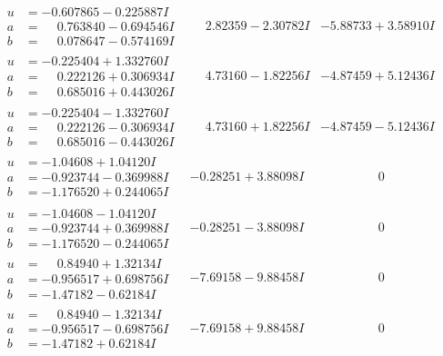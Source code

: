 \documentclass[1p]{elsarticle_modified}
\theoremstyle{definition}
\begin{document}
$$\begin{array}{c|c|c}
\begin{aligned}
u &= -0.607865 - 0.225887 I \\
a &= \phantom{-}0.763840 - 0.694546 I \\
b &= \phantom{-}0.078647 - 0.574169 I\end{aligned}
 & \phantom{-}2.82359 - 2.30782 I & -5.88733 + 3.58910 I \\ \hline\begin{aligned}
u &= -0.225404 + 1.332760 I \\
a &= \phantom{-}0.222126 + 0.306934 I \\
b &= \phantom{-}0.685016 + 0.443026 I\end{aligned}
 & \phantom{-}4.73160 - 1.82256 I & -4.87459 + 5.12436 I \\ \hline\begin{aligned}
u &= -0.225404 - 1.332760 I \\
a &= \phantom{-}0.222126 - 0.306934 I \\
b &= \phantom{-}0.685016 - 0.443026 I\end{aligned}
 & \phantom{-}4.73160 + 1.82256 I & -4.87459 - 5.12436 I \\ \hline\begin{aligned}
u &= -1.04608 + 1.04120 I \\
a &= -0.923744 - 0.369988 I \\
b &= -1.176520 + 0.244065 I\end{aligned}
 & -0.28251 + 3.88098 I & \phantom{-0.000000 } 0 \\ \hline\begin{aligned}
u &= -1.04608 - 1.04120 I \\
a &= -0.923744 + 0.369988 I \\
b &= -1.176520 - 0.244065 I\end{aligned}
 & -0.28251 - 3.88098 I & \phantom{-0.000000 } 0 \\ \hline\begin{aligned}
u &= \phantom{-}0.84940 + 1.32134 I \\
a &= -0.956517 + 0.698756 I \\
b &= -1.47182 - 0.62184 I\end{aligned}
 & -7.69158 - 9.88458 I & \phantom{-0.000000 } 0 \\ \hline\begin{aligned}
u &= \phantom{-}0.84940 - 1.32134 I \\
a &= -0.956517 - 0.698756 I \\
b &= -1.47182 + 0.62184 I\end{aligned}
 & -7.69158 + 9.88458 I & \phantom{-0.000000 } 0 \\ \hline\begin{aligned}

\end{aligned}
\end{array}$$
\end{document}
